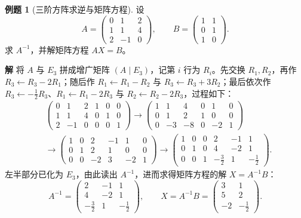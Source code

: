 \documentclass[UTF8, fontset=fandol, a4paper, 12pt]{ctexart}
\theoremstyle{definition}
\newtheorem{example}[definition]{例题}
\begin{document}
\begin{example}[三阶方阵求逆与矩阵方程]
设
\[
 A=\begin{pmatrix}0&1&2\\1&1&4\\2&-1&0\end{pmatrix},\qquad
 B=\begin{pmatrix}1&1\\0&1\\1&0\end{pmatrix}.
\]
求 $A^{-1}$，并解矩阵方程 $AX=B$。
\end{example}
\noindent\textbf{解}\quad
将 $A$ 与 $E_3$ 拼成增广矩阵 $(A\mid E_3)$，记第 $i$ 行为 $R_i$。先交换 $R_1,R_2$，再作 $R_3\gets R_3-2R_1$；随后作 $R_1\gets R_1-R_2$ 与 $R_3\gets R_3+3R_2$；最后依次作 $R_3\gets-\frac12 R_3$、$R_1\gets R_1-2R_3$ 与 $R_2\gets R_2-2R_3$，过程如下：
\[
 \begin{aligned}
 &\left(\begin{array}{rrr|rrr}
  0&1&2&1&0&0\\
  1&1&4&0&1&0\\
  2&-1&0&0&0&1
 \end{array}\right)
 \longrightarrow
 \left(\begin{array}{rrr|rrr}
  1&1&4&0&1&0\\
  0&1&2&1&0&0\\
  0&-3&-8&0&-2&1
 \end{array}\right)\\[0.6em]
 &\longrightarrow
 \left(\begin{array}{rrr|rrr}
  1&0&2&-1&1&0\\
  0&1&2&1&0&0\\
  0&0&-2&3&-2&1
 \end{array}\right)
 \longrightarrow
 \left(\begin{array}{rrr|rrr}
  1&0&0&2&-1&1\\
  0&1&0&4&-2&1\\
  0&0&1&-\tfrac32&1&-\tfrac12
 \end{array}\right).
 \end{aligned}
\]
左半部分已化为 $E_3$，由此读出 $A^{-1}$，进而求得矩阵方程的解 $X=A^{-1}B$：
\[
 A^{-1}=\begin{pmatrix}2&-1&1\\4&-2&1\\-\tfrac32&1&-\tfrac12\end{pmatrix},\qquad
 X=A^{-1}B=\begin{pmatrix}3&1\\5&2\\-2&-\tfrac12\end{pmatrix}.
\]
\end{document}
